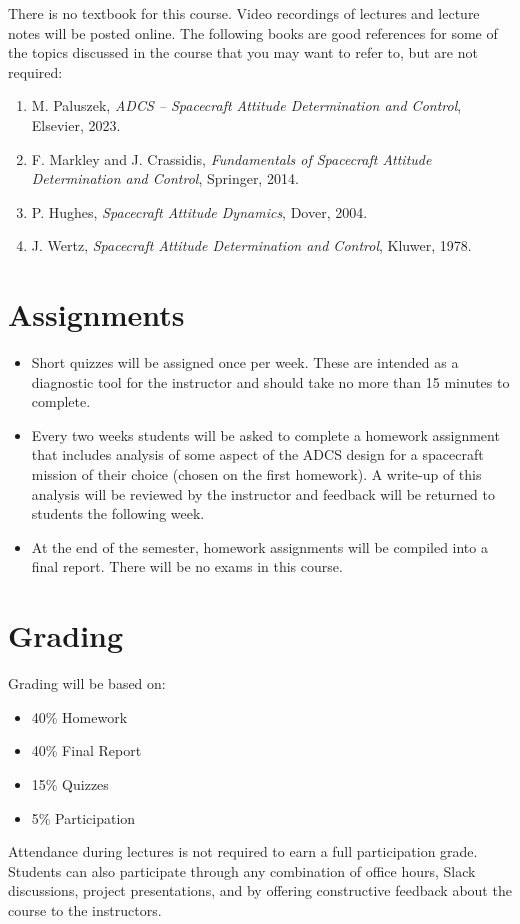 \documentclass[11pt,letterpaper]{article}
\begin{document}
There is no textbook for this course. Video recordings of lectures and lecture notes will be posted online. The following books are good references for some of the topics discussed in the course that you may want to refer to, but are not required:

\begin{enumerate}
	\item M. Paluszek, \textit{ADCS -- Spacecraft Attitude Determination and Control}, Elsevier, 2023.
	\item F. Markley and J. Crassidis, \textit{Fundamentals of Spacecraft Attitude Determination and Control}, Springer, 2014.
	\item P. Hughes, \textit{Spacecraft Attitude Dynamics}, Dover, 2004.
	\item J. Wertz, \textit{Spacecraft Attitude Determination and Control}, Kluwer, 1978.
\end{enumerate}
\section*{Assignments}

\begin{itemize}
	\item Short quizzes will be assigned once per week. These are intended as a diagnostic tool for the instructor and should take no more than 15 minutes to complete.
	\item Every two weeks students will be asked to complete a homework assignment that includes analysis of some aspect of the ADCS design for a spacecraft mission of their choice (chosen on the first homework). A write-up of this analysis will be reviewed by the instructor and feedback will be returned to students the following week.
	\item At the end of the semester, homework assignments will be compiled into a final report. There will be no exams in this course.
\end{itemize}

\section*{Grading}

Grading will be based on:
\begin{itemize}
	\item 40\% Homework
	\item 40\% Final Report
	\item 15\% Quizzes
	\item 5\% Participation
\end{itemize}
Attendance during lectures is not required to earn a full participation grade. Students can also participate through any combination of office hours, Slack discussions, project presentations, and by offering constructive feedback about the course to the instructors.
\end{document}
